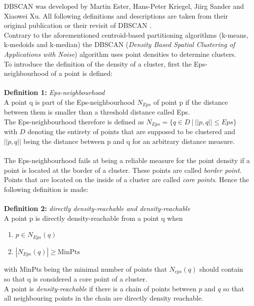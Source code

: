 DBSCAN was developed by Martin Ester, Hans-Peter Kriegel, Jiirg Sander and Xiaowei Xu. All following definitions and descriptions are taken from their original publication \cite{dbscan} or their revisit of DBSCAN \cite{dbscanrevisited}.\\
Contrary to the aforementioned centroid-based partitioning algorithms (k-means, k-medoids and k-median) the DBSCAN (\textit{Density Based Spatial Clustering of Applications with Noise}) algorithm uses point densities to determine clusters.\\
To introduce the definition of the density of a cluster, first the Eps-neighbourhood of a point is defined:\\
\ \\
\textbf{Definition 1:} \textit{Eps-neighbourhood}\\
A point q is part of the Eps-neighbourhood $N_{Eps}$ of point p if the distance between them is smaller than a threshold distance called Eps.\\
The Eps-neighbourhood therefore is defined as $N_{Eps} = \{q \in D \ | \ ||p, q|| \leq Eps \}$ with $D$ denoting the entirety of points that are supposed to be clustered and $||p, q||$ being the distance between p and q for an arbitrary distance measure.\\
\ \\
The Eps-neighbourhood fails at being a reliable measure for the point density if a point is located at the border of a cluster. These points are called \textit{border point}. Points that are located on the inside of a cluster are called \textit{core points}. Hence the following definition is made:\\
\ \\
\textbf{Definition 2:} \textit{directly density-reachable and density-reachable}\\
A point p is directly density-reachable from a point q when
\begin{enumerate}
    \item $p \in N_{Eps}(q)$
    \item $|N_{Eps}(q)| \geq \text{MinPts}$
\end{enumerate}
with MinPts being the minimal number of points that $N_{eps}(q)$ should contain so that q is considered a core point of a cluster.\\
A point is \textit{density-reachable} if there is a chain of points between $p$ and $q$ so that all neighbouring points in the chain are directly density reachable.\\
\ \\
